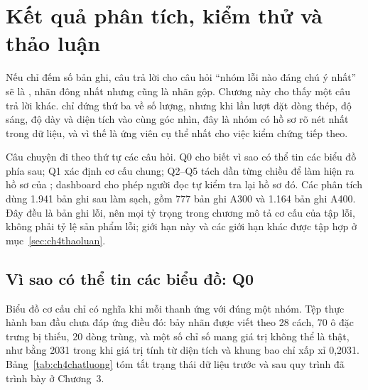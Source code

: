 \chapter{Kết quả phân tích, kiểm thử và thảo luận}
\label{chap:ketqua}

\newcommand{\ghiChuHinh}[1]{\fbox{\parbox{0.92\linewidth}{\small\setstretch{1.1}\textbf{[CẦN CHÈN ẢNH]}\newline #1}}}

Nếu chỉ đếm số bản ghi, câu trả lời cho câu hỏi ``nhóm lỗi nào đáng chú ý nhất'' sẽ là , nhãn đông nhất nhưng cũng là nhãn gộp. Chương này cho thấy một câu trả lời khác.  chỉ đứng thứ ba về số lượng, nhưng khi lần lượt đặt dòng thép, độ sáng, độ dày và diện tích vào cùng góc nhìn, đây là nhóm có hồ sơ rõ nét nhất trong dữ liệu, và vì thế là ứng viên cụ thể nhất cho việc kiểm chứng tiếp theo.

Câu chuyện đi theo thứ tự các câu hỏi. Q0 cho biết vì sao có thể tin các biểu đồ phía sau; Q1 xác định cơ cấu chung; Q2--Q5 tách dần từng chiều để làm hiện ra hồ sơ của ; dashboard cho phép người đọc tự kiểm tra lại hồ sơ đó. Các phân tích dùng 1.941 bản ghi sau làm sạch, gồm 777 bản ghi A300 và 1.164 bản ghi A400. Đây đều là bản ghi lỗi, nên mọi tỷ trọng trong chương mô tả cơ cấu của tập lỗi, không phải tỷ lệ sản phẩm lỗi; giới hạn này và các giới hạn khác được tập hợp ở mục~\ref{sec:ch4thaoluan}.

\section{Vì sao có thể tin các biểu đồ: Q0}
\label{sec:ch4q0}

Biểu đồ cơ cấu chỉ có nghĩa khi mỗi thanh ứng với đúng một nhóm. Tệp thực hành ban đầu chưa đáp ứng điều đó: bảy nhãn được viết theo 28 cách, 70 ô đặc trưng bị thiếu, 20 dòng trùng, và một số chỉ số mang giá trị không thể là thật, như  bằng 2031 trong khi giá trị tính từ diện tích và khung bao chỉ xấp xỉ 0,2031. Bảng~\ref{tab:ch4chatluong} tóm tắt trạng thái dữ liệu trước và sau quy trình đã trình bày ở Chương~3.

